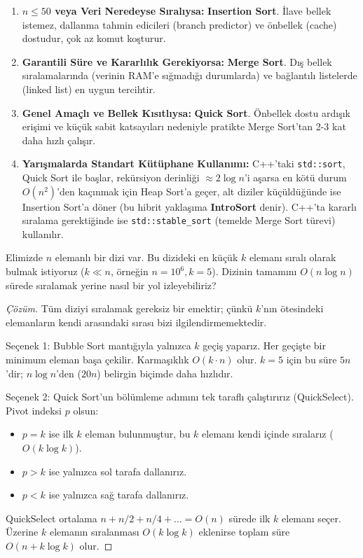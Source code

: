 \begin{enumerate}
    \item \textbf{$n \le 50$ veya Veri Neredeyse Sıralıysa:} \textbf{Insertion Sort}. İlave bellek istemez, dallanma tahmin edicileri (branch predictor) ve önbellek (cache) dostudur, çok az komut koşturur.
    \item \textbf{Garantili Süre ve Kararlılık Gerekiyorsa:} \textbf{Merge Sort}. Dış bellek sıralamalarında (verinin RAM'e sığmadığı durumlarda) ve bağlantılı listelerde (linked list) en uygun tercihtir.
    \item \textbf{Genel Amaçlı ve Bellek Kısıtlıysa:} \textbf{Quick Sort}. Önbellek dostu ardışık erişimi ve küçük sabit katsayıları nedeniyle pratikte Merge Sort'tan 2-3 kat daha hızlı çalışır.
    \item \textbf{Yarışmalarda Standart Kütüphane Kullanımı:} C++'taki \linebreak[4]\texttt{std::sort}, Quick Sort ile başlar, rekürsiyon derinliği $\approx 2\log n$'i aşarsa en kötü durum $O(n^2)$'den kaçınmak için Heap Sort'a geçer, alt diziler küçüldüğünde ise Insertion Sort'a döner (bu hibrit yaklaşıma \textbf{IntroSort} denir). C++'ta kararlı sıralama gerektiğinde ise \texttt{std::stable\_sort} (temelde Merge Sort türevi) kullanılır.
\end{enumerate}

\begin{example}
Elimizde $n$ elemanlı bir dizi var. Bu dizideki en küçük $k$ elemanı sıralı olarak bulmak istiyoruz ($k \ll n$, örneğin $n = 10^6, k = 5$). Dizinin tamamını $O(n \log n)$ sürede sıralamak yerine nasıl bir yol izleyebiliriz?
\end{example}

\begin{proof}[Çözüm]
Tüm diziyi sıralamak gereksiz bir emektir; çünkü $k$'nın ötesindeki elemanların kendi arasındaki sırası bizi ilgilendirmemektedir.

Seçenek 1: Bubble Sort mantığıyla yalnızca $k$ geçiş yaparız. Her geçişte bir minimum eleman başa çekilir. Karmaşıklık $O(k \cdot n)$ olur. $k=5$ için bu süre $5n$'dir; $n \log n$'den ($20n$) belirgin biçimde daha hızlıdır.

Seçenek 2: Quick Sort'un bölümleme adımını tek taraflı çalıştırırız (QuickSelect). Pivot indeksi $p$ olsun:
\begin{itemize}
    \item $p = k$ ise ilk $k$ eleman bulunmuştur, bu $k$ elemanı kendi içinde sıralarız ($O(k \log k)$).
    \item $p > k$ ise yalnızca sol tarafa dallanırız.
    \item $p < k$ ise yalnızca sağ tarafa dallanırız.
\end{itemize}
QuickSelect ortalama $n + n/2 + n/4 + \dots = O(n)$ sürede ilk $k$ elemanı seçer. Üzerine $k$ elemanın sıralanması $O(k \log k)$ eklenirse toplam süre $O(n + k \log k)$ olur.
\end{proof}

